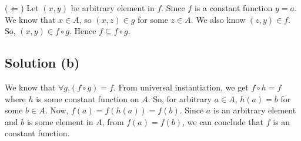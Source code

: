 \documentclass{article}
\begin{document}
($\Leftarrow$) Let $(x,y)$ be arbitrary element in $f$. Since $f$ is a
constant function $y = a$. We know that $x \in A$, so $(x,z) \in g$
for some $z \in A$. We also know $(z,y) \in f$. So, $(x,y) \in f \circ
g$. Hence $f \subseteq f \circ g$.

\subsection{Solution (b)}
We know that $\forall g. (f \circ g) = f$. From universal
instantiation, we get $f \circ h = f$ where $h$ is some constant
function on $A$. So, for arbitrary $a \in A$, $h(a) = b$ for some
$b \in A$. Now, $f(a) = f(h(a)) = f(b)$. Since $a$ is an arbitrary
element and $b$ is some element in $A$, from $f(a) = f(b)$, we can
conclude that $f$ is an constant function. 
\end{document}
